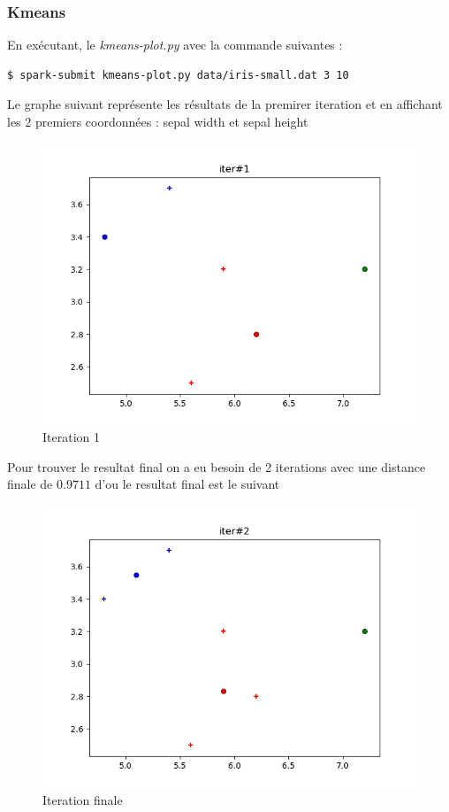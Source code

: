 \documentclass[french]{article}
\begin{document}
\subsubsection{Kmeans}

\noindent En exécutant, le \textit{kmeans-plot.py} avec la commande suivantes : 
\begin{lstlisting}[language=bash]
  $ spark-submit kmeans-plot.py data/iris-small.dat 3 10
\end{lstlisting}

Le graphe suivant représente les résultats de la premirer iteration et en affichant les 2 premiers coordonnées : sepal width et sepal height
\begin{figure}[h!]
  \centering
  \includegraphics[width=\linewidth]{img/result-kmeans-1.png}
  \caption{Iteration 1}
\end{figure}

Pour trouver le resultat final on a eu besoin de 2 iterations avec une distance finale de $0.9711$ d'ou le resultat final est le suivant
\begin{figure}[h!]
  \centering
  \includegraphics[width=\linewidth]{img/result-kmeans-final.png}
  \caption{Iteration finale}
\end{figure}
\end{document}
